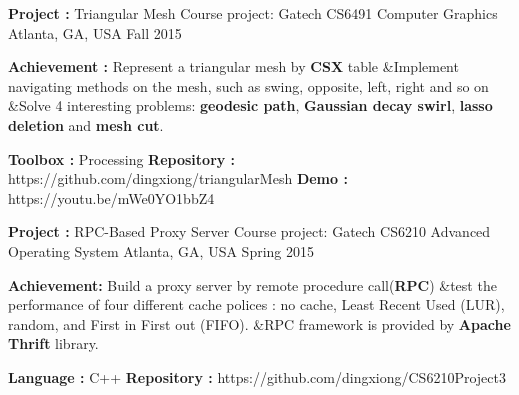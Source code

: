 


\begin{cventries}


\cventry
{\textbf{Project :} Triangular Mesh} 
{Course project: Gatech CS6491 Computer Graphics} 
{Atlanta, GA, USA} %
{Fall 2015} %
{
  \begin{cvitems}
  \item {\textbf{Achievement :} Represent a triangular mesh by \textbf{CSX} table \quad\&\quad Implement navigating
      methods on the mesh, such as swing, opposite, left, right and so on
      \quad\&\quad  Solve 4 interesting problems: \textbf{geodesic path}, 
      \textbf{Gaussian decay swirl}, \textbf{lasso deletion} and \textbf{mesh cut}.}
  \item {\textbf{Toolbox :} Processing \quad
      \textbf{Repository :} {\color{red} https://github.com/dingxiong/triangularMesh}
      \quad
      \textbf{Demo : }  {\color{red} https://youtu.be/mWe0YO1bbZ4}}
  \end{cvitems}
}

\cventry
{\textbf{Project :} RPC-Based Proxy Server} 
{Course project: Gatech CS6210 Advanced Operating System} 
{Atlanta, GA, USA} %
{Spring 2015} %
{
  \begin{cvitems}
  \item {\textbf{Achievement:} Build a proxy server by remote procedure call(\textbf{RPC}) 
\quad\&\quad test the performance of four different cache polices : no cache, Least Recent Used (LUR), random,
      and First in First out (FIFO). 
\quad\&\quad RPC framework is provided by \textbf{Apache Thrift} library.
    }
  \item {\textbf{Language :} C++  \quad
      \textbf{Repository :} {\color{red} https://github.com/dingxiong/CS6210Project3}
    }
  \end{cvitems}
}


\end{cventries}
